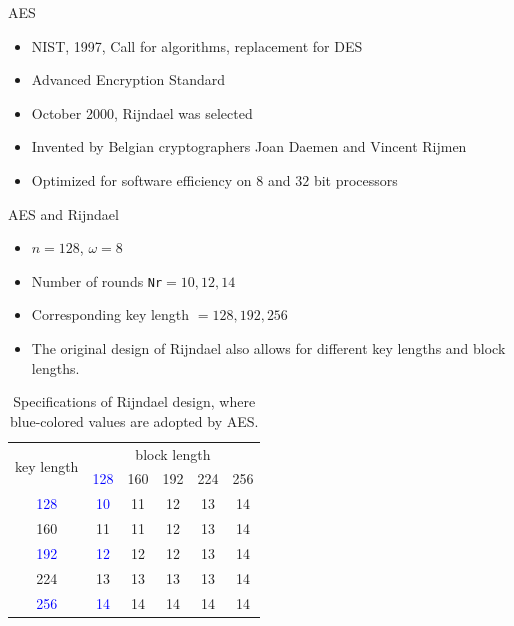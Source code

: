 \begin{frame}{AES}
    \begin{itemize}
        \item NIST, 1997, Call for algorithms, replacement for DES
        \item Advanced Encryption Standard
        \item October 2000, Rijndael was selected
        \item Invented by Belgian cryptographers Joan Daemen and Vincent Rijmen
        \item Optimized for software efficiency on $8$ and $32$ bit processors
    \end{itemize}
\end{frame}

\begin{frame}{AES and Rijndael}
    \begin{itemize}
        \item $n=128$, $\omega=8$
        \item Number of rounds \texttt{Nr}$=10,12,14$
        \item Corresponding key length $=128,192,256$
        \item The original design of Rijndael also allows for different key lengths and block lengths.
    \end{itemize}
    \begin{table}[htb]
\centering
\begin{tabular}{|c|ccccc|}
\hline
\multirow{2}{*}{key length} & \multicolumn{5}{c|}{block length} \\ \cline{2-6} 
 & \textcolor{blue}{128} & 160 & 192 & 224 & 256 \\\hline
 \textcolor{blue}{128} & \textcolor{blue}{10} & 11 & 12 & 13 & 14\\
 160 & 11 & 11 & 12 & 13 & 14\\
 \textcolor{blue}{192} & \textcolor{blue}{12} & 12 & 12 & 13 & 14\\
 224 & 13 & 13 & 13 & 13 & 14\\
 \textcolor{blue}{256} & \textcolor{blue}{14} & 14 & 14 & 14 & 14\\\hline
\end{tabular}
\caption{Specifications of Rijndael design, where blue-colored values are adopted by AES.}
\end{table}
\end{frame}

